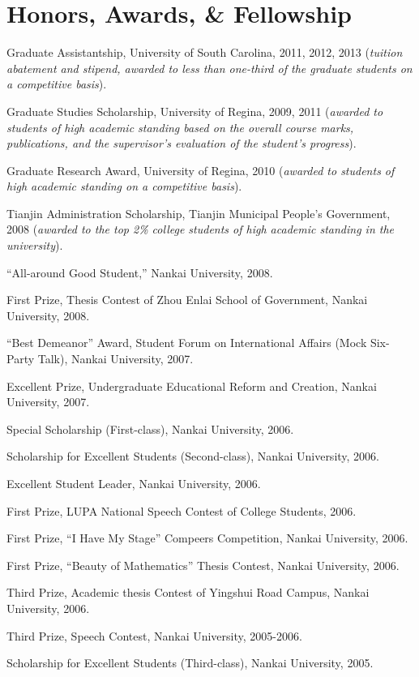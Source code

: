 \documentclass[letterpaper]{article}
\renewenvironment{itemize}{
  \begin{list}{}{
    \setlength{\leftmargin}{1.5em}
  }
}{
  \end{list}
}
\begin{document}
\section*{Honors, Awards, \& Fellowship}
\begin{itemize}
\item Graduate Assistantship, University of South Carolina, 2011, 2012, 2013 (\textit{tuition abatement and stipend, awarded to less than one-third of the graduate students on a competitive basis}).
\item Graduate Studies Scholarship, University of Regina, 2009, 2011 (\textit{awarded to students of high academic standing based on the overall course marks, publications, and the supervisor's evaluation of the student's progress}).
\item Graduate Research Award, University of Regina, 2010 (\textit{awarded to students of high academic standing on a competitive basis}).
\item Tianjin Administration Scholarship, Tianjin Municipal People's Government, 2008 (\textit{awarded to the top 2\% college students of high academic standing in the university}).
\item ``All-around Good Student,'' Nankai University, 2008.
\item First Prize, Thesis Contest of Zhou Enlai School of Government, Nankai University, 2008.
\item ``Best Demeanor'' Award, Student Forum on International Affairs (Mock Six-Party Talk), Nankai University, 2007.
\item Excellent Prize, Undergraduate Educational Reform and Creation, Nankai University, 2007.
\item Special Scholarship (First-class), Nankai University, 2006.
\item Scholarship for Excellent Students (Second-class), Nankai University, 2006.
\item Excellent Student Leader, Nankai University, 2006.
\item First Prize, LUPA National Speech Contest of College Students, 2006.
\item First Prize, ``I Have My Stage'' Compeers Competition, Nankai University, 2006.
\item First Prize, ``Beauty of Mathematics'' Thesis Contest, Nankai University, 2006.
\item Third Prize, Academic thesis Contest of Yingshui Road Campus, Nankai University, 2006.
\item Third Prize, Speech Contest, Nankai University, 2005-2006.
\item Scholarship for Excellent Students (Third-class), Nankai University, 2005.
\end{itemize}
\end{document}
